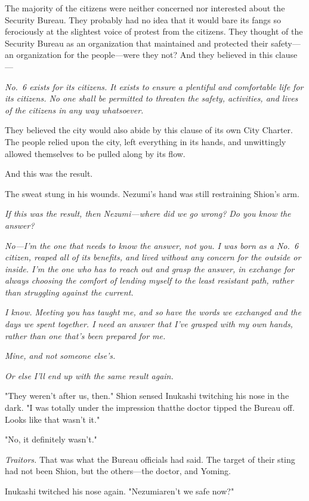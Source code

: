 The majority of the citizens were neither concerned nor interested about
the Security Bureau. They probably had no idea that it would bare its
fangs so ferociously at the slightest voice of protest from the
citizens. They thought of the Security Bureau as an organization that
maintained and protected their safety---an organization for the
people---were they not? And they believed in this clause---

\emph{No.~6 exists for its citizens. It exists to ensure a plentiful and
comfortable life for its citizens. No one shall be permitted to threaten
the safety, activities, and lives of the citizens in any way whatsoever.}

They believed the city would also abide by this clause of its own City
Charter. The people relied upon the city, left everything in its hands,
and unwittingly allowed themselves to be pulled along by its flow.

And this was the result.

The sweat stung in his wounds. Nezumi's hand was still restraining
Shion's arm.

\emph{If this was the result, then Nezumi---where did we go wrong? Do you know
the answer?}

\emph{No---I'm the one that needs to know the answer, not you. I was born as a
No.~6 citizen, reaped all of its benefits, and lived without any concern
for the outside or inside. I'm the one who has to reach out and grasp
the answer, in exchange for always choosing the comfort of lending
myself to the least resistant path, rather than struggling against the
current.}

\emph{I know. Meeting you has taught me, and so have the words we exchanged
and the days we spent together. I need an answer that I've grasped with
my own hands, rather than one that's been prepared for me.}

\emph{Mine, and not someone else's.}

\emph{Or else I'll end up with the same result again.}

"They weren't after us, then." Shion sensed Inukashi twitching his nose
in the dark. "I was totally under the impression that\el the doctor
tipped the Bureau off. Looks like that wasn't it."

"No, it definitely wasn't."

\emph{Traitors.} That was what the Bureau officials had said. The target of
their sting had not been Shion, but the others---the doctor, and Yoming.

Inukashi twitched his nose again. "Nezumi\el aren't we safe now?"

